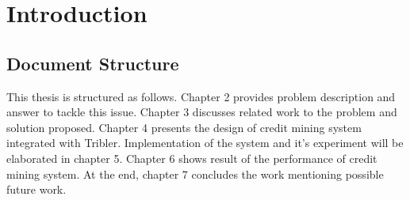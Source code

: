 \chapter{Introduction}
\label{chp:introduction}


\section{Document Structure}
This thesis is structured as follows. Chapter 2 provides problem description and answer to tackle this issue. Chapter 3 discusses related work to the problem and solution proposed. Chapter 4 presents the design of credit mining system integrated with Tribler. Implementation of the system and it's experiment will be elaborated in chapter 5. Chapter 6 shows result of the performance of credit mining system. At the end, chapter 7 concludes the work mentioning possible future work.

